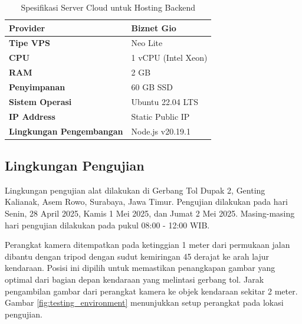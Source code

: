 \begin{table}[htbp]
  \centering
  \begin{tabular}{|l|l|}
  \hline
  \textbf{Provider} & Biznet Gio \\
  \hline
  \textbf{Tipe VPS} & Neo Lite \\
  \hline
  \textbf{CPU} & 1 vCPU (Intel Xeon) \\
  \hline
  \textbf{RAM} & 2 GB \\
  \hline
  \textbf{Penyimpanan} & 60 GB SSD \\
  \hline
  \textbf{Sistem Operasi} & Ubuntu 22.04 LTS \\
  \hline
  \textbf{IP Address} & Static Public IP \\
  \hline
  \textbf{Lingkungan Pengembangan} & Node.js v20.19.1  \\
  \hline
  \end{tabular}
  \caption{Spesifikasi Server Cloud untuk Hosting Backend}
  \label{tab:cloud_server_specs}
  \end{table}

\subsection{Lingkungan Pengujian}

Lingkungan pengujian alat dilakukan di Gerbang Tol Dupak 2, Genting Kalianak, Asem Rowo, Surabaya, Jawa Timur. Pengujian dilakukan pada hari Senin, 28 April 2025, Kamis 1 Mei 2025, dan Jumat 2 Mei 2025. Masing-masing hari pengujian dilakukan pada pukul 08:00 - 12:00 WIB. 

Perangkat kamera ditempatkan pada ketinggian 1 meter dari permukaan jalan dibantu dengan tripod dengan sudut kemiringan 45 derajat ke arah lajur kendaraan. Posisi ini dipilih untuk memastikan penangkapan gambar yang optimal dari bagian depan kendaraan yang melintasi gerbang tol. Jarak pengambilan gambar dari perangkat kamera ke objek kendaraan sekitar 2 meter. Gambar \ref{fig:testing_environment} menunjukkan setup perangkat pada lokasi pengujian.

